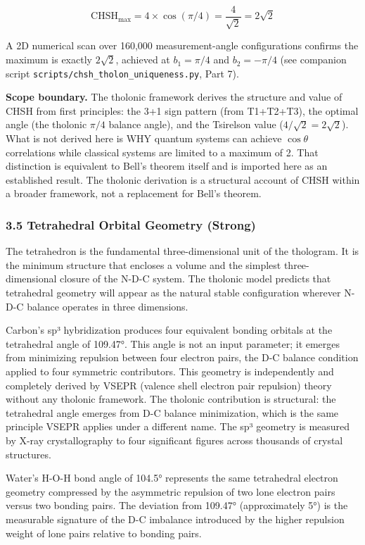 \documentclass[
  11pt,
  letterpaper,
]{article}
\begin{document}
\[\mathrm{CHSH}_{\max} = 4 \times \cos(\pi/4) = \frac{4}{\sqrt{2}} = 2\sqrt{2}\]

A 2D numerical scan over 160,000 measurement-angle configurations
confirms the maximum is exactly \(2\sqrt{2}\), achieved at
\(b_1 = \pi/4\) and \(b_2 = -\pi/4\) (see companion script
\texttt{scripts/chsh\_tholon\_uniqueness.py}, Part 7).

\textbf{Scope boundary.} The tholonic framework derives the structure
and value of CHSH from first principles: the 3+1 sign pattern (from
T1+T2+T3), the optimal angle (the tholonic \(\pi/4\) balance angle), and
the Tsirelson value (\(4/\sqrt{2} = 2\sqrt{2}\)). What is not derived
here is WHY quantum systems can achieve \(\cos\theta\) correlations
while classical systems are limited to a maximum of 2. That distinction
is equivalent to Bell's theorem itself and is imported here as an
established result. The tholonic derivation is a structural account of
CHSH within a broader framework, not a replacement for Bell's theorem.

\subsubsection{3.5 Tetrahedral Orbital Geometry
(Strong)}\label{tetrahedral-orbital-geometry-strong}

The tetrahedron is the fundamental three-dimensional unit of the
thologram. It is the minimum structure that encloses a volume and the
simplest three-dimensional closure of the N-D-C system. The tholonic
model predicts that tetrahedral geometry will appear as the natural
stable configuration wherever N-D-C balance operates in three
dimensions.

Carbon's sp³ hybridization produces four equivalent bonding orbitals at
the tetrahedral angle of 109.47°. This angle is not an input parameter;
it emerges from minimizing repulsion between four electron pairs, the
D-C balance condition applied to four symmetric contributors. This
geometry is independently and completely derived by VSEPR (valence shell
electron pair repulsion) theory without any tholonic framework. The
tholonic contribution is structural: the tetrahedral angle emerges from
D-C balance minimization, which is the same principle VSEPR applies
under a different name. The sp³ geometry is measured by X-ray
crystallography to four significant figures across thousands of crystal
structures.

Water's H-O-H bond angle of 104.5° represents the same tetrahedral
electron geometry compressed by the asymmetric repulsion of two lone
electron pairs versus two bonding pairs. The deviation from 109.47°
(approximately 5°) is the measurable signature of the D-C imbalance
introduced by the higher repulsion weight of lone pairs relative to
bonding pairs.
\end{document}
